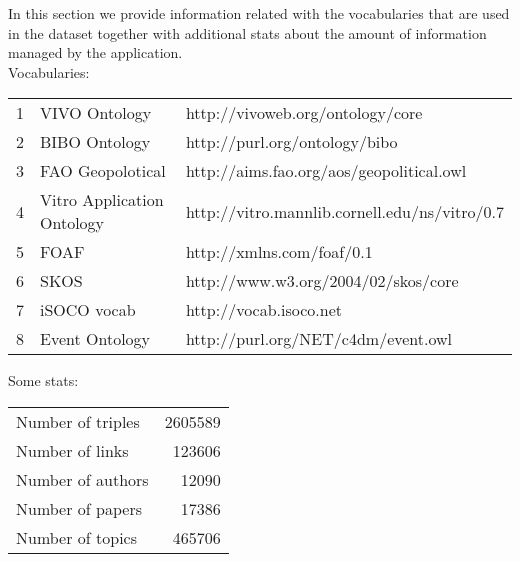 In this section we provide information related with the vocabularies that are  used in the dataset together with additional stats about the amount of information managed by the application.\\
Vocabularies:

\begin{tabular}{ l l l }
  1 & VIVO Ontology & http://vivoweb.org/ontology/core \\
  2 & BIBO Ontology & http://purl.org/ontology/bibo \\
  3 & FAO Geopolotical  & http://aims.fao.org/aos/geopolitical.owl \\
  4 & Vitro Application Ontology  & http://vitro.mannlib.cornell.edu/ns/vitro/0.7 \\
  5 & FOAF  & http://xmlns.com/foaf/0.1 \\
  6 & SKOS  & http://www.w3.org/2004/02/skos/core \\
  7 & iSOCO vocab & http://vocab.isoco.net \\ 
  8 & Event Ontology & http://purl.org/NET/c4dm/event.owl \\       
\end{tabular}

Some stats:

\begin{tabular}{ l r  }
  Number of triples & 2605589 \\
  Number of links &   123606  \\
  Number of authors & 12090   \\
  Number of papers & 17386 \\
  Number of topics & 465706 \\
\end{tabular}